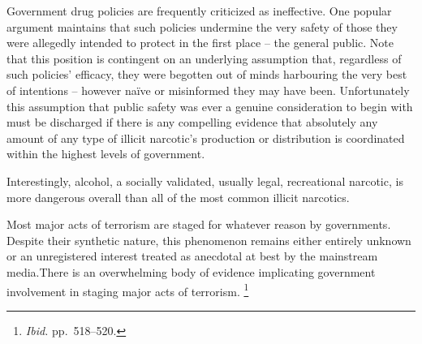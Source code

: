 Government drug policies are frequently criticized as ineffective. One popular argument maintains that such policies undermine the very safety of those they were allegedly intended to protect in the first place -- the general public. Note that this position is contingent on an underlying assumption that, regardless of such policies' efficacy, they were begotten out of minds harbouring the very best of intentions -- however naïve or misinformed they may have been. Unfortunately this assumption that public safety was ever a genuine consideration to begin with must be discharged if there is any compelling evidence that absolutely any amount of any type of illicit narcotic's production or distribution is coordinated within the highest levels of government.

Interestingly, alcohol, a socially validated, usually legal, recreational narcotic, is more dangerous overall than all of the most common illicit narcotics.\footnotecite[extras={ See figure 2.}][nutt2010]


Most major acts of terrorism are staged for whatever reason by governments. Despite their synthetic nature, this phenomenon remains either entirely unknown or an unregistered interest treated as anecdotal at best by the mainstream media. There is an overwhelming body of evidence implicating government involvement in staging major acts of terrorism.
\footnotecite[extras={ p.~193.}][shirer1960]\footnote{{\it Ibid.} pp.~518--520.} %
\footnotecite[gasiorowski2000]%
\footnotecite[northwoods]
\footnotecite[bumiller2010] %
\footnotecite[gourley2012] %
\footnotecite[harrit2009]
\footnotecite[king2010] %
\footnotecite[secker2010] %
\footnotecite[shipler2012] %
\footnotecite[schwartz2013]
\footnotecite[shakir2008] %
\footnotecite[extras={ p.~74.}][grad2009] %
\footnotecite[interfax2013] %

